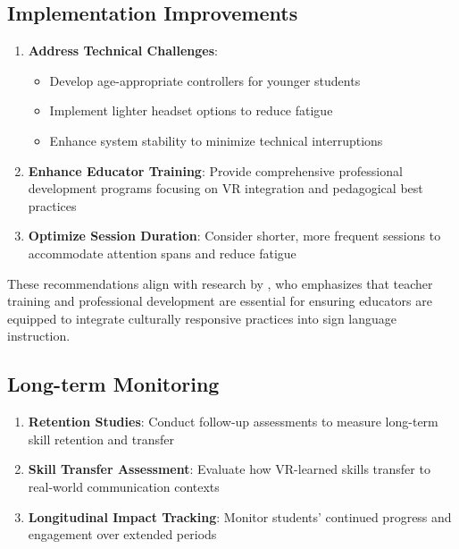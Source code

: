 \documentclass[12pt,a4paper]{article}
\begin{document}
\subsection{Implementation Improvements}

\begin{enumerate}
    \item \textbf{Address Technical Challenges}:
    \begin{itemize}
        \item Develop age-appropriate controllers for younger students
        \item Implement lighter headset options to reduce fatigue
        \item Enhance system stability to minimize technical interruptions
    \end{itemize}
    
    \item \textbf{Enhance Educator Training}: Provide comprehensive professional development programs focusing on VR integration and pedagogical best practices
    
    \item \textbf{Optimize Session Duration}: Consider shorter, more frequent sessions to accommodate attention spans and reduce fatigue
\end{enumerate}

These recommendations align with research by \citet{fidan2023perspectives}, who emphasizes that teacher training and professional development are essential for ensuring educators are equipped to integrate culturally responsive practices into sign language instruction.

\subsection{Long-term Monitoring}

\begin{enumerate}
    \item \textbf{Retention Studies}: Conduct follow-up assessments to measure long-term skill retention and transfer
    
    \item \textbf{Skill Transfer Assessment}: Evaluate how VR-learned skills transfer to real-world communication contexts
    
    \item \textbf{Longitudinal Impact Tracking}: Monitor students' continued progress and engagement over extended periods
\end{enumerate}
\end{document}
